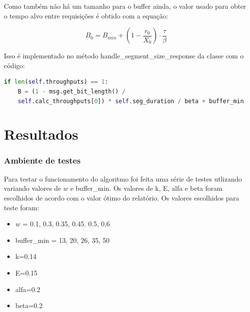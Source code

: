 \documentclass[10pt,twocolumn,letterpaper]{article}
\begin{document}
	Como também não há um tamanho para o buffer ainda, o valor usado para obter o tempo alvo entre requisições é obtido com a equação:
	
	\begin{equation}
		B_0 = B_{min} + (1 - \frac{r_0}{X_0}) \cdot \frac{\tau}{\beta}
	\end{equation}
	
	Isso é implementado no método handle\_segment\_size\_response da classe com o código:
	
	\begin{lstlisting}[language=python]
if len(self.throughputs) == 1:
	B = (1 - msg.get_bit_length() /
	self.calc_throughputs[0]) * self.seg_duration / beta + buffer_min
	\end{lstlisting}
	\section{Resultados}
	\subsubsection{Ambiente de testes}
	Para testar o funcionamento do algoritmo foi feita uma série de testes utlizando variando valores de $w$ e buffer\_min. Os valores de k, E, alfa e beta foram escolhidos de acordo com o valor ótimo do relatório. Os valores escolhidos para teste foram: 
	\begin{itemize}
		\item $w$ = 0.1, 0.3, 0.35, 0.45. 0.5, 0,6
		\item buffer\_min  = 13, 20, 26, 35, 50
		\item k=0.14 
		\item E=0.15 
		\item alfa=0.2
		\item beta=0.2
	\end{itemize}
\end{document}
